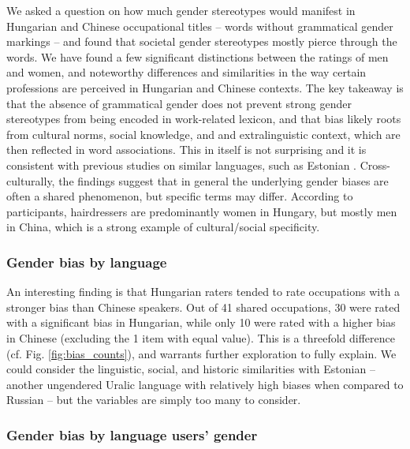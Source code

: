 \documentclass[11pt]{article}
\begin{document}
We asked a question on how much gender stereotypes would manifest in Hungarian and Chinese occupational titles -- words without grammatical gender markings -- and found that societal gender stereotypes mostly pierce through the words. We have found a few significant distinctions between the ratings of men and women, and noteworthy differences and similarities in the way certain professions are perceived in Hungarian and Chinese contexts. The key takeaway is that the absence of grammatical gender does not prevent strong gender stereotypes from being encoded in work-related lexicon, and that bias likely roots from cultural norms, social knowledge, and and extralinguistic context, which are then reflected in word associations. This in itself is not surprising and it is consistent with previous studies on similar languages, such as Estonian \citet{kaukonen_2025_gender}. Cross-culturally, the findings suggest that in general the underlying gender biases are often a shared phenomenon, but specific terms may differ. According to participants, hairdressers are predominantly women in Hungary, but mostly men in China, which is a strong example of cultural/social specificity.

\subsubsection{Gender bias by language}

An interesting finding is that Hungarian raters tended to rate occupations with a stronger bias than Chinese speakers. Out of 41 shared occupations, 30 were rated with a significant bias in Hungarian, while only 10 were rated with a higher bias in Chinese (excluding the 1 item with equal value). This is a threefold difference (cf. Fig. \ref{fig:bias_counts}), and warrants further exploration to fully explain. We could consider the linguistic, social, and historic similarities with Estonian -- another ungendered Uralic language with relatively high biases when compared to Russian \citep{kaukonen_2025_gender} -- but the variables are simply too many to consider. 


\subsubsection{Gender bias by language users' gender}
\end{document}
